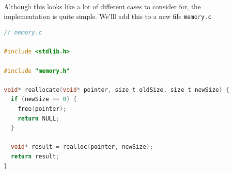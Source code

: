 Although this looks like a lot of different cases to consider for, the implementation is quite simple. We'lll add this to a new file \verb,memory.c,

\begin{lstlisting}[language=C]
// memory.c

#include <stdlib.h>

#include "memory.h"

void* reallocate(void* pointer, size_t oldSize, size_t newSize) {
  if (newSize == 0) {
    free(pointer);
    return NULL;
  }

  void* result = realloc(pointer, newSize);
  return result;
}
\end{lstlisting}


